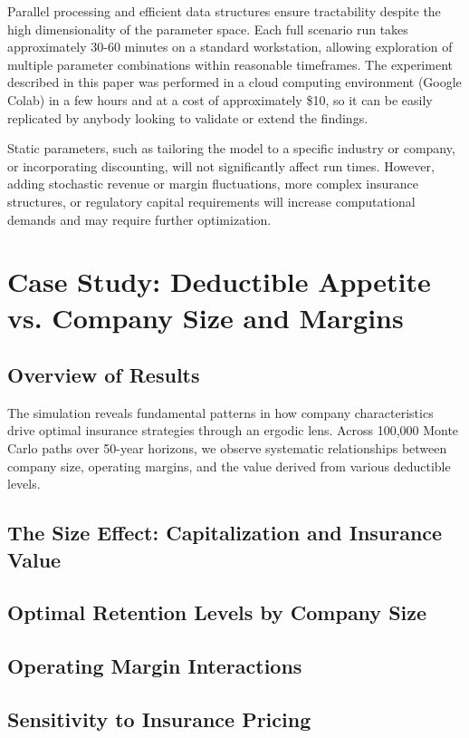 \documentclass[11pt,letterpaper]{article}
\begin{document}
Parallel processing and efficient data structures ensure tractability despite the high dimensionality of the parameter space. Each full scenario run takes approximately 30-60 minutes on a standard workstation, allowing exploration of multiple parameter combinations within reasonable timeframes. The experiment described in this paper was performed in a cloud computing environment (Google Colab) in a few hours and at a cost of approximately \$10, so it can be easily replicated by anybody looking to validate or extend the findings.

Static parameters, such as tailoring the model to a specific industry or company, or incorporating discounting, will not significantly affect run times. However, adding stochastic revenue or margin fluctuations, more complex insurance structures, or regulatory capital requirements will increase computational demands and may require further optimization.
\section{Case Study: Deductible Appetite vs. Company Size and Margins}

\subsection{Overview of Results}

The simulation reveals fundamental patterns in how company characteristics drive optimal insurance strategies through an ergodic lens. Across 100,000 Monte Carlo paths over 50-year horizons, we observe systematic relationships between company size, operating margins, and the value derived from various deductible levels.

\subsection{The Size Effect: Capitalization and Insurance Value}

\subsection{Optimal Retention Levels by Company Size}

\subsection{Operating Margin Interactions}

\subsection{Sensitivity to Insurance Pricing}
\end{document}
